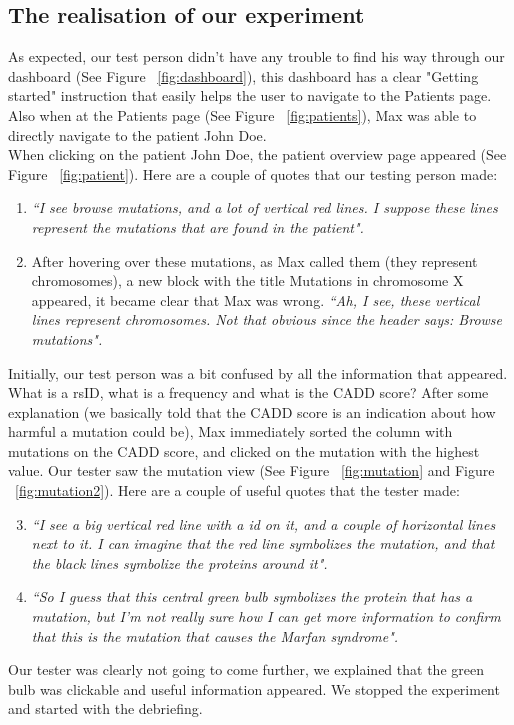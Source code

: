 \subsection{The realisation of our experiment}
As expected, our test person didn't have any trouble to find his way through our dashboard (See Figure ~\ref{fig:dashboard}), this dashboard has a clear "Getting started" instruction that easily helps the user to navigate to the Patients page. Also when at the Patients page (See Figure ~\ref{fig:patients}), Max was able to directly navigate to the patient John Doe. \\
When clicking on the patient John Doe, the patient overview page appeared (See Figure ~\ref{fig:patient}). Here are a couple of quotes that our testing person made:
\begin{enumerate}
\item \textit{``I see browse mutations, and a lot of vertical red lines. I suppose these lines represent the mutations that are found in the patient".}
\item After hovering over these mutations, as Max called them (they represent chromosomes), a new block with the title Mutations in chromosome X appeared, it became clear that Max was wrong. \textit{``Ah, I see, these vertical lines represent chromosomes. Not that obvious since the header says: Browse mutations".}
\end{enumerate}
Initially, our test person was a bit confused by all the information that appeared. What is a rsID, what is a frequency and what is the CADD score? After some explanation (we basically told that the CADD score is an indication about how harmful a mutation could be), Max immediately sorted the column with mutations on the CADD score, and clicked on the mutation with the highest value. Our tester saw the mutation view (See Figure ~\ref{fig:mutation} and Figure ~\ref{fig:mutation2}). Here are a couple of useful quotes that the tester made: 
\begin{enumerate}
\setcounter{enumi}{2}
\item \textit{``I see a big vertical red line with a id on it, and a couple of horizontal lines next to it. I can imagine that the red line symbolizes the mutation, and that the black lines symbolize the proteins around it". }
\item \textit{``So I guess that this central green bulb symbolizes the protein that has a mutation, but I'm not really sure how I can get more information to confirm that this is the mutation that causes the Marfan syndrome". }
\end{enumerate}
Our tester was clearly not going to come further, we explained that the green bulb was clickable and useful information appeared. We stopped the experiment and started with the debriefing.
